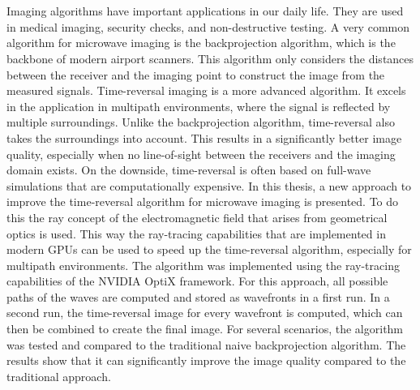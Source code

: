 \chapter{\abstractname}

Imaging algorithms have important applications in our daily life. 
They are used in medical imaging, security checks, and non-destructive testing. 
A very common algorithm for microwave imaging is the backprojection algorithm, which is the backbone of modern airport scanners.
This algorithm only considers the distances between the receiver and the imaging point to construct the image from the measured signals.
Time-reversal imaging is a more advanced algorithm.
It excels in the application in multipath environments, where the signal is reflected by multiple surroundings.
Unlike the backprojection algorithm, time-reversal also takes the surroundings into account.
This results in a significantly better image quality, especially when no line-of-sight between the receivers and the imaging domain exists.
On the downside, time-reversal is often based on full-wave simulations that are computationally expensive.
In this thesis, a new approach to improve the time-reversal algorithm for microwave imaging is presented.
To do this the ray concept of the electromagnetic field that arises from geometrical optics is used.
This way the ray-tracing capabilities that are implemented in modern GPUs can be used to speed up the time-reversal algorithm, especially for multipath environments.
The algorithm was implemented using the ray-tracing capabilities of the NVIDIA OptiX framework.
For this approach, all possible paths of the waves are computed and stored as wavefronts in a first run.
In a second run, the time-reversal image for every wavefront is computed, which can then be combined to create the final image.
For several scenarios, the algorithm was tested and compared to the traditional naive backprojection algorithm.
The results show that it can significantly improve the image quality compared to the traditional approach.
